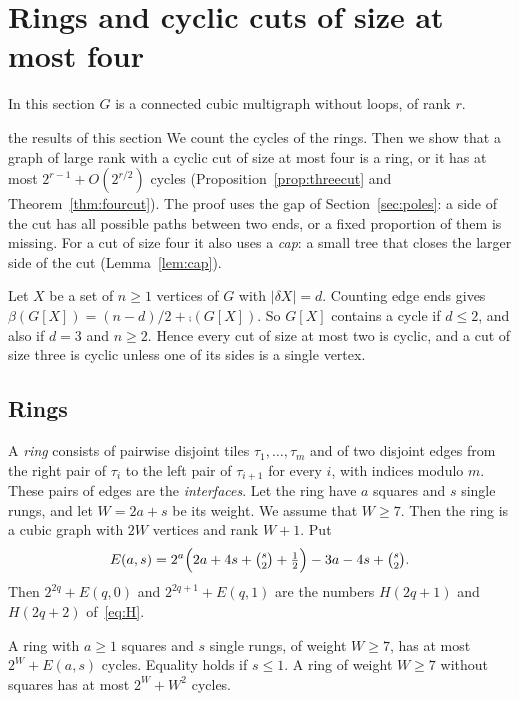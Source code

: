 \section{Rings and cyclic cuts of size at most four}\label{sec:cuts}

In this section $G$ is a connected cubic multigraph without loops, of rank $r$.

\begin{idea}{the results of this section}
We count the cycles of the rings. Then we show that a graph of large rank with a cyclic cut of
size at most four is a ring, or it has at most $2^{r-1}+O(2^{r/2})$ cycles
(Proposition~\ref{prop:threecut} and Theorem~\ref{thm:fourcut}). The proof uses the gap of
Section~\ref{sec:poles}: a side of the cut has all possible paths between two ends, or a fixed
proportion of them is missing. For a cut of size four it also uses a \emph{cap}: a small tree
that closes the larger side of the cut (Lemma~\ref{lem:cap}).
\end{idea}

Let $X$ be a set of $n\ge1$ vertices of $G$ with $|\delta X|=d$. Counting edge ends gives
$\beta(G[X])=(n-d)/2+\comp(G[X])$. So $G[X]$ contains a cycle if $d\le2$, and also if $d=3$ and
$n\ge2$. Hence every cut of size at most two is cyclic, and a cut of size three is cyclic unless
one of its sides is a single vertex.

\subsection{Rings}\label{sec:rings}

A \emph{ring} consists of pairwise disjoint tiles $\tau_1,\dots,\tau_m$ and of two disjoint edges
from the right pair of $\tau_i$ to the left pair of $\tau_{i+1}$ for every $i$, with indices modulo
$m$. These pairs of edges are the \emph{interfaces}. Let the ring have $a$ squares and $s$ single
rungs, and let $W=2a+s$ be its weight. We assume that $W\ge7$. Then the ring is a cubic graph with
$2W$ vertices and rank $W+1$. Put
\[
  E(a,s)=2^{a}\Bigl(2a+4s+\tbinom s2+\tfrac12\Bigr)-3a-4s+\tbinom s2 .
\]
Then $2^{2q}+E(q,0)$ and $2^{2q+1}+E(q,1)$ are the numbers $H(2q+1)$ and $H(2q+2)$
of~\eqref{eq:H}.

\begin{proposition}[Rings]\label{prop:rings}
A ring with $a\ge1$ squares and $s$ single rungs, of weight $W\ge7$, has at most $2^{W}+E(a,s)$
cycles. Equality holds if $s\le1$. A ring of weight
$W\ge7$ without squares has at most $2^{W}+W^{2}$ cycles.
\end{proposition}

